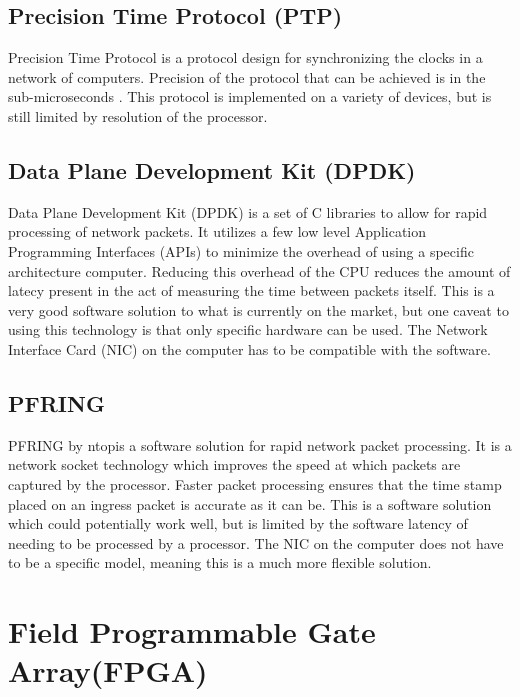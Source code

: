 \subsection{Precision Time Protocol (PTP)}

Precision Time Protocol is a protocol design for synchronizing the clocks in a network of computers.
Precision of the protocol that can be achieved is in the sub-microseconds \cite{ieee1588}. 
This protocol is implemented on a variety of devices, but is still limited by resolution of the processor.

\subsection{Data Plane Development Kit (DPDK)}

\par Data Plane Development Kit (DPDK) is a set of C libraries to allow for rapid processing of network packets.
It utilizes a few low level Application Programming Interfaces (APIs) to minimize the overhead of using a specific architecture computer.
Reducing this overhead of the CPU reduces the amount of latecy present in the act of measuring the time between packets itself.
This is a very good software solution to what is currently on the market, but one caveat to using this technology is that only specific hardware can be used.
The Network Interface Card (NIC) on the computer has to be compatible with the software.

\subsection{PF\textunderscore RING}

\par PF\textunderscore RING by ntop\texttrademark is a software solution for rapid network packet processing.
It is a network socket technology which improves the speed at which packets are captured by the processor.
Faster packet processing ensures that the time stamp placed on an ingress packet is accurate as it can be.
This is a software solution which could potentially work well, but is limited by the software latency of needing to be processed by a processor.
The NIC on the computer does not have to be a specific model, meaning this is a much more flexible solution.


\section{Field Programmable Gate Array(FPGA)}

